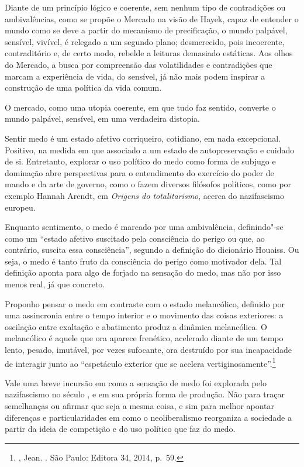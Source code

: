Diante de um princípio lógico e coerente, sem nenhum tipo de
contradições ou ambivalências, como se propõe o Mercado na visão de
Hayek, capaz de entender o mundo como se deve a partir do mecanismo de
precificação, o mundo palpável, sensível, vivível, é relegado a um
segundo plano; desmerecido, pois incoerente, contraditório e, de certo
modo, rebelde a leituras demasiado estáticas. Aos olhos do Mercado, a
busca por compreensão das volatilidades e contradições que marcam a
experiência de vida, do sensível, já não mais podem inspirar a
construção de uma política da vida comum.

O mercado, como uma utopia coerente, em que tudo faz sentido, converte o
mundo palpável, sensível, em uma verdadeira distopia.

\asterisc

Sentir medo é um estado afetivo corriqueiro, cotidiano, em nada
excepcional. Positivo, na medida em que associado a um estado de
autopreservação e cuidado de si. Entretanto, explorar o uso político do
medo como forma de subjugo e dominação abre perspectivas para o
entendimento do exercício do poder de mando e da arte de governo, como o
fazem diversos filósofos políticos, como por exemplo Hannah Arendt, em
\emph{Origens do totalitarismo}, acerca do nazifascismo europeu.

Enquanto sentimento, o medo é marcado por uma ambivalência,
definindo"-se como um ``estado afetivo suscitado pela consciência do
perigo ou que, ao contrário, suscita essa consciência'', segundo a
definição do dicionário Houaiss. Ou seja, o medo é tanto fruto da
consciência do perigo como motivador dela. Tal definição aponta para
algo de forjado na sensação do medo, mas não por isso
menos real, já que concreto.

Proponho pensar o medo em contraste
com o estado melancólico, definido por uma
assincronia entre o tempo interior e o movimento das coisas exteriores:
a oscilação entre exaltação e abatimento produz a dinâmica melancólica.
O melancólico é aquele que ora aparece frenético, acelerado diante de um
tempo lento, pesado, imutável, por vezes sufocante, ora destruído por
sua incapacidade de interagir junto ao ``espetáculo exterior que se
acelera vertiginosamente''.\footnote{, Jean. {}. São Paulo: Editora 34, 2014, p.~59.}

Vale uma breve incursão em como a sensação de medo foi explorada pelo nazifascismo no século , e em sua própria forma de produção. Não para traçar semelhanças ou afirmar que seja a mesma coisa, e sim para melhor apontar diferenças e particularidades em como o neoliberalismo reorganiza a sociedade a partir da ideia de competição e do uso político que faz do medo.

